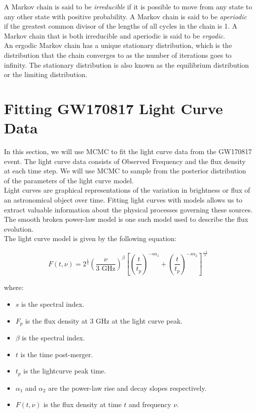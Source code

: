 A Markov chain is said to be \textit{irreducible} if it is possible to move from any state to any other state with positive probability. A Markov chain is said to be \textit{aperiodic} if the greatest common divisor of the lengths of all cycles in the chain is 1. A Markov chain that is both irreducible and aperiodic is said to be \textit{ergodic}. \\

An ergodic Markov chain has a unique stationary distribution, which is the distribution that the chain converges to as the number of iterations goes to infinity. The stationary distribution is also known as the equilibrium distribution or the limiting distribution. \\

\section{Fitting GW170817 Light Curve Data}

In this section, we will use MCMC to fit the light curve data from the GW170817 event. The light curve data consists of Observed Frequency and the flux density at each time step. We will use MCMC to sample from the posterior distribution of the parameters of the light curve model. \\

Light curves are graphical representations of the variation in brightness or flux of an astronomical object over time. Fitting light curves with models allows us to extract valuable information about the physical processes governing these sources. The smooth broken power-law model is one such model used to describe the flux evolution. \\

The light curve model is given by the following equation:

\begin{equation}
	F(t, \nu) = 2 ^ {\frac{1}{s}} \left(\dfrac{\nu}{3 \text{ GHz}}\right) ^ \beta \left[\left(\dfrac{t}{t_p} \right)^{-s \alpha_1} + \left(\dfrac{t}{t_p} \right)^{-s \alpha_2}\right] ^ {\frac{-1}{s}}
	\label{eq:smooth_broken_power_law}
\end{equation}

where:

\begin{itemize}
	\item $s$ is the spectral index.
	\item $F_p$ is the flux density at $3$ GHz at the light curve peak.
	\item $\beta$ is the spectral index.
	\item $t$ is the time post-merger.
	\item $t_p$ is the lightcurve peak time.
	\item $\alpha_1$ and $\alpha_2$ are the power-law rise and decay slopes respectively.
	\item $F(t, \nu)$ is the flux density at time $t$ and frequency $\nu$.
\end{itemize}

